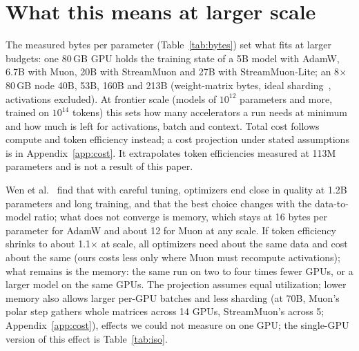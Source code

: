 \documentclass[10pt]{article}
\newcommand{\method}{StreamMuon}\newcommand{\lite}{StreamMuon-Lite}
\begin{document}
\section{What this means at larger scale}
\label{sec:scale}
The measured bytes per parameter (Table~\ref{tab:bytes}) set what fits at larger budgets: one 80\,GB GPU holds the training
state of a 5B model with AdamW, 6.7B with Muon, 20B with \method{} and 27B with \lite{}; an 8$\times$80\,GB node 40B, 53B,
160B and 213B (weight-matrix bytes, ideal sharding~\citep{rajbhandari2020zero}, activations excluded). At frontier scale (models of $10^{12}$ parameters and more, trained
on $10^{14}$ tokens) this sets how many accelerators a run needs at minimum and how much is left for activations,
batch and context. Total cost follows compute and token efficiency instead; a cost projection under stated
assumptions is in Appendix~\ref{app:cost}. It extrapolates token efficiencies measured at 113M parameters and is not a
result of this paper.

\noindent Wen et al.~\citep{wen2026fantastic} find that with careful tuning, optimizers end close in quality at 1.2B
parameters and long training, and that the best choice changes with the data-to-model ratio; what does not converge is
memory, which stays at 16 bytes per parameter for AdamW and about 12 for Muon at any scale. If token efficiency shrinks to about 1.1$\times$ at scale, all optimizers need about the same data and cost
about the same (ours costs less only where Muon must
recompute activations); what remains is the memory: the same run
on two to four times fewer GPUs, or a larger model on the same GPUs. The projection assumes equal utilization; lower memory also allows larger per-GPU batches and less sharding
(at 70B, Muon's polar step gathers whole matrices across 14 GPUs, \method{}'s across 5; Appendix~\ref{app:cost}), effects we could not measure
on one GPU; the single-GPU version of this effect is Table~\ref{tab:iso}.
\end{document}
